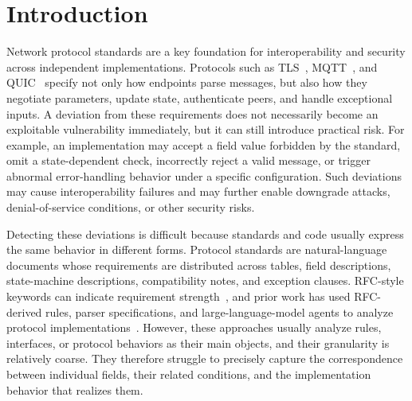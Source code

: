 \section{Introduction}

Network protocol standards are a key foundation for interoperability and
security across independent implementations. Protocols such as
TLS~\cite{rfc5246,rfc8446}, MQTT~\cite{mqtt311,mqtt5}, and
QUIC~\cite{rfc9000,rfc9001,rfc9002} specify not only how endpoints parse
messages, but also how they negotiate parameters, update state, authenticate
peers, and handle exceptional inputs. A deviation from these requirements does
not necessarily become an exploitable vulnerability immediately, but it can
still introduce practical risk. For example, an implementation may accept a
field value forbidden by the standard, omit a state-dependent check, incorrectly
reject a valid message, or trigger abnormal error-handling behavior under a
specific configuration. Such deviations may cause interoperability failures and
may further enable downgrade attacks, denial-of-service conditions, or other
security risks.

Detecting these deviations is difficult because standards and code usually
express the same behavior in different forms. Protocol standards are
natural-language documents whose requirements are distributed across tables,
field descriptions, state-machine descriptions, compatibility notes, and
exception clauses. RFC-style keywords can indicate requirement
strength~\cite{rfc2119,rfc8174}, and prior work has used RFC-derived rules,
parser specifications, and large-language-model agents to analyze protocol
implementations~\cite{chen2022ribdetector,zheng2025parcleanse,zheng2025rfcaudit,song2026protocolguard}.
However, these approaches usually analyze rules, interfaces, or protocol
behaviors as their main objects, and their granularity is relatively coarse.
They therefore struggle to precisely capture the correspondence between
individual fields, their related conditions, and the implementation behavior
that realizes them.


